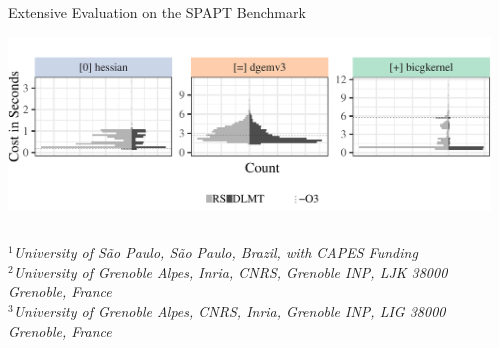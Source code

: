 \documentclass[11pt, compress, aspectratio=169, xcolor={table,usenames,dvipsnames}]{beamer}
\begin{document}
\begin{frame}
\begin{columns}
\begin{column}{0.89\columnwidth}
\begin{columns}
\begin{column}[t]{0.48\columnwidth}
\begin{block}{ \vphantom{g}Extensive Evaluation on the SPAPT Benchmark}
\begin{itemize}
\begin{center}
\begin{center}
\includegraphics[width=0.85\columnwidth]{../../../img/split_histograms.pdf}
\end{center}
\end{center}
\end{itemize}
\end{block}
\end{column}
\end{columns}
\begin{columns}
\begin{column}{0.9\columnwidth}
\begin{flushleft}
\vspace{1.3em}
  {\small
    \textit{$^{1}$University of São Paulo, São Paulo, Brazil, with CAPES Funding \\
      $^{2}$University of Grenoble Alpes, Inria, CNRS, Grenoble INP, LJK 38000 Grenoble, France \\[-0.2em]
      $^{3}$University of Grenoble Alpes, CNRS, Inria, Grenoble INP, LIG 38000 Grenoble, France
    }
  }
\end{flushleft}
\end{column}
\begin{column}{0.1\columnwidth}
\end{column}
\end{columns}
\end{column}

\begin{column}{0.09\columnwidth}
\end{column}
\end{columns}
\end{frame}
\end{document}
